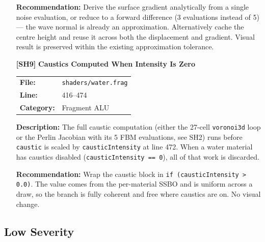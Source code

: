 \documentclass[a4paper,12pt]{article}
\newcommand{\severitybox}[2]{%
  \colorbox{#1}{\makebox[2.5cm][c]{\textcolor{white}{\textbf{#2}}}}%
}
\begin{document}
\begin{enumerate}[leftmargin=*]
  \textbf{Recommendation:}
  Derive the surface gradient analytically from a single noise evaluation, or
  reduce to a forward difference (3 evaluations instead of 5) — the wave normal
  is already an approximation. Alternatively cache the centre height and reuse it
  across both the displacement and gradient. Visual result is preserved within
  the existing approximation tolerance.

\item[\textbf{[SH9]}] \textbf{Caustics Computed When Intensity Is Zero}
  \hfill \severitybox{mediumcolor}{MEDIUM}

  \begin{tabular}{ll}
    \textbf{File:} & \texttt{shaders/water.frag} \\
    \textbf{Line:} & 416--474 \\
    \textbf{Category:} & Fragment ALU \\
  \end{tabular}

  \textbf{Description:}
  The full caustic computation (either the 27-cell \texttt{voronoi3d} loop or the
  Perlin Jacobian with its 5 FBM evaluations, see SH2) runs before
  \texttt{caustic} is scaled by \texttt{causticIntensity} at line 472. When a
  water material has caustics disabled (\texttt{causticIntensity == 0}), all of
  that work is discarded.

  \textbf{Recommendation:}
  Wrap the caustic block in \texttt{if (causticIntensity > 0.0)}. The value comes
  from the per-material SSBO and is uniform across a draw, so the branch is fully
  coherent and free where caustics are on. No visual change.

\end{enumerate}

\newpage

\subsection{Low Severity}
\end{document}
